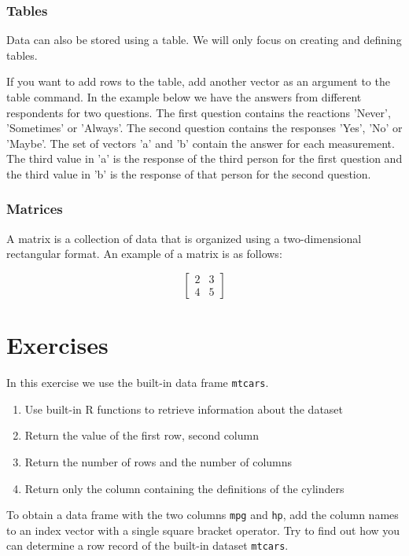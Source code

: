\subsubsection{Tables}

Data can also be stored using a table. We will only focus on creating and defining tables.



If you want to add rows to the table, add another vector as an argument to the table command.
In the example below we have the answers from different respondents for two questions.
The first question contains the reactions 'Never', 'Sometimes' or 'Always'.
The second question contains the responses 'Yes', 'No' or 'Maybe'.
The set of vectors 'a' and 'b' contain the answer for each measurement.
The third value in 'a' is the response of the third person for the first question and the third value in 'b' is the response of that person for the second question.



\subsubsection{Matrices}

A matrix is a collection of data that is organized using a two-dimensional rectangular format. An example of a matrix is as follows:

\[
\begin{bmatrix}
2 & 3 \\ 
4 & 5  
\end{bmatrix}
\]



\section{Exercises}

\begin{exercise}
    In this exercise we use the built-in data frame \texttt{mtcars}. 
    \begin{enumerate}
        \item   Use built-in R functions to retrieve information about the dataset
        \item   Return the value of the first row, second column
        \item   Return the number of rows and the number of columns
        \item   Return only the column containing the definitions of the cylinders
    \end{enumerate}
    
    To obtain a data frame with the two columns \texttt{mpg} and \texttt{hp}, 
    add the column names to an index vector with a single square bracket operator.
    Try to find out how you can determine a row record of the built-in dataset \texttt{mtcars}.
\end{exercise}


